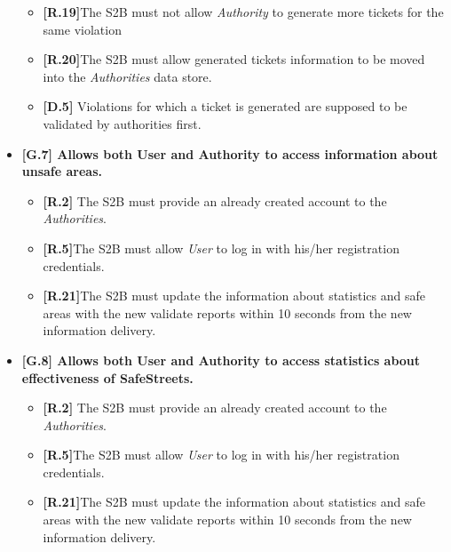 \begin{itemize}
\begin{itemize}
         \item \textbf{[R.19]}The S2B must not allow \textit{Authority} to generate more tickets for the same violation
         
         \item \textbf{[R.20]}The S2B must allow generated tickets information to be moved into the \textit{Authorities} data store.
        
        \item \textbf{[D.5]} Violations for which a ticket is generated are supposed to be validated by authorities first.
        
    \end{itemize}


\item \textbf{{[G.7]} Allows both User and Authority to access information about unsafe areas.}
    \begin{itemize}
         \item \textbf{[R.2]} The S2B must provide an already created account to the \textit{Authorities}.

        \item \textbf{[R.5]}The S2B must allow \textit{User} to log in with his/her registration credentials.
        
        \item \textbf{[R.21]}The S2B must update the information about statistics and safe areas with the new validate reports within 10 seconds from the new information delivery.
    \end{itemize}
    
\item \textbf{{[G.8]} Allows both User and Authority to access statistics about effectiveness of SafeStreets.}

    \begin{itemize}
         \item \textbf{[R.2]} The S2B must provide an already created account to the \textit{Authorities}.

        \item \textbf{[R.5]}The S2B must allow \textit{User} to log in with his/her registration credentials.
        
        \item \textbf{[R.21]}The S2B must update the information about statistics and safe areas with the new validate reports within 10 seconds from the new information delivery.
        
    \end{itemize}
    

\end{itemize}
